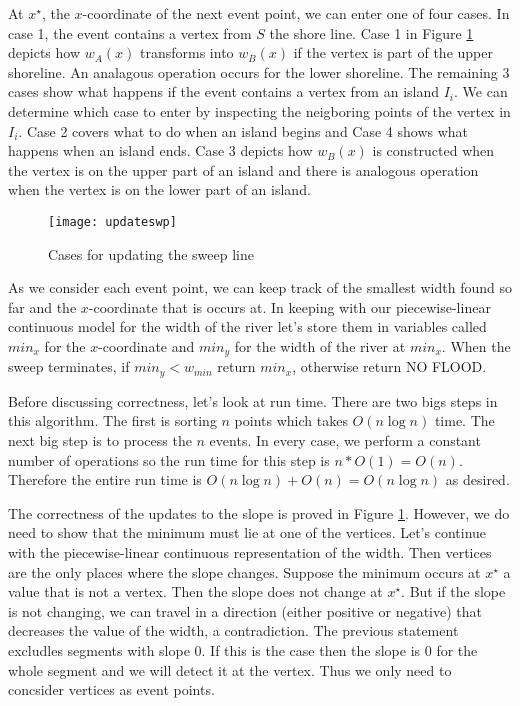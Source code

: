 \documentclass[11pt]{article}
\begin{document}
At $x^\star$, the $x$-coordinate of the next event point, we can enter one of four cases.
In case 1, the event contains a vertex from $S$ the shore line.
Case 1 in Figure \ref{fig:updateswp} depicts how $w_A(x)$ transforms into $w_B(x)$ if the vertex is part of the upper shoreline.
An analagous operation occurs for the lower shoreline.
The remaining 3 cases show what happens if the event contains a vertex from an island $I_i$.
We can determine which case to enter by inspecting the neigboring points of the vertex in $I_i$.
Case 2 covers what to do when an island begins and Case 4 shows what happens when an island ends.
Case 3 depicts how $w_B (x)$ is constructed when the vertex is on the upper part of an island and there is analogous operation when the vertex is on the lower part of an island.

\begin{figure}[h]
    \centering
    \texttt{[image: updateswp]}
    \caption{Cases for updating the sweep line}
    \label{fig:updateswp}
\end{figure}

As we consider each event point, we can keep track of the smallest width found so far and the $x$-coordinate that is occurs at.
In keeping with our piecewise-linear continuous model for the width of the river let's store them in variables called $min_x$ for the $x$-coordinate and $min_y$ for the width of the river at $min_x$.
When the sweep terminates, if $min_y < w_{min}$ return $min_x$, otherwise return NO FLOOD.

Before discussing correctness, let's look at run time.
There are two bigs steps in this algorithm.
The first is sorting $n$ points which takes $O(n \log n)$ time.
The next big step is to process the $n$ events.
In every case, we perform a constant number of operations so the run time for this step is $n * O(1) = O(n)$.
Therefore the entire run time is $O(n \log n) + O(n) = O(n \log n)$ as desired.

The correctness of the updates to the slope is proved in Figure \ref{fig:updateswp}.
However, we do need to show that the minimum must lie at one of the vertices.
Let's continue with the piecewise-linear continuous representation of the width.
Then vertices are the only places where the slope changes.
Suppose the minimum occurs at $x^\star$ a value that is not a vertex.
Then the slope does not change at $x^\star$.
But if the slope is not changing, we can travel in a direction (either positive or negative) that decreases the value of the width, a contradiction.
The previous statement excludles segments with slope 0.
If this is the case then the slope is 0 for the whole segment and we will detect it at the vertex.
Thus we only need to concsider vertices as event points.
\end{document}
